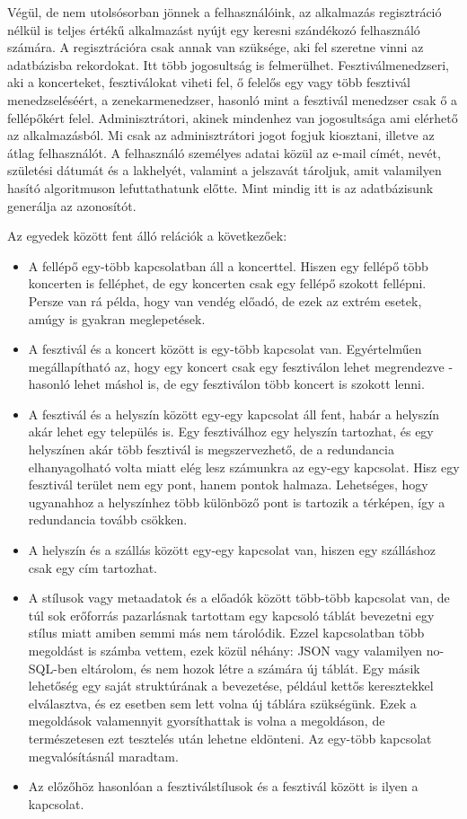 Végül, de nem utolsósorban jönnek a felhasználóink, az alkalmazás regisztráció nélkül is teljes értékű alkalmazást nyújt egy keresni szándékozó felhasználó számára. A regisztrációra csak annak van szüksége, aki fel szeretne vinni az adatbázisba rekordokat. Itt több jogosultság is  felmerülhet. Fesztiválmenedzseri, aki a koncerteket, fesztiválokat viheti fel, ő felelős egy vagy több fesztivál menedzseléséért, a zenekarmenedzser, hasonló mint a fesztivál menedzser csak ő a fellépőkért felel. Adminisztrátori, akinek mindenhez van jogosultsága ami elérhető az alkalmazásból. Mi csak az adminisztrátori jogot fogjuk kiosztani, illetve az átlag felhasználót. A felhasználó személyes adatai közül az e-mail címét, nevét, születési dátumát és a lakhelyét, valamint a jelszavát tároljuk, amit valamilyen hasító algoritmuson lefuttathatunk előtte. Mint mindig itt is az adatbázisunk generálja az azonosítót.

Az egyedek között fent álló relációk a következőek:
\begin{itemize}
\item A fellépő egy-több kapcsolatban áll a koncerttel. Hiszen egy fellépő több koncerten is felléphet, de egy koncerten csak egy fellépő szokott fellépni. Persze van rá példa, hogy van vendég előadó, de ezek az extrém esetek, amúgy is gyakran meglepetések.
\item A fesztivál és a koncert között is egy-több kapcsolat van. Egyértelműen megállapítható az, hogy egy koncert csak egy fesztiválon lehet megrendezve - hasonló lehet máshol is, de egy fesztiválon több koncert is szokott lenni.
\item A fesztivál és a helyszín között egy-egy kapcsolat áll fent, habár a helyszín akár lehet egy település is. Egy fesztiválhoz egy helyszín tartozhat, és egy helyszínen akár több fesztivál is megszervezhető, de a redundancia elhanyagolható volta miatt elég lesz számunkra az egy-egy kapcsolat. Hisz egy fesztivál terület nem egy pont, hanem pontok halmaza. Lehetséges, hogy ugyanahhoz a helyszínhez több különböző pont is tartozik a térképen, így a redundancia tovább csökken.
\item  A helyszín és a szállás között egy-egy kapcsolat van, hiszen egy szálláshoz csak egy cím tartozhat.
\item A stílusok vagy metaadatok és a előadók között több-több kapcsolat van, de túl sok erőforrás pazarlásnak tartottam egy kapcsoló táblát bevezetni egy stílus miatt amiben semmi más nem tárolódik. Ezzel kapcsolatban több megoldást is számba vettem, ezek közül néhány: JSON vagy valamilyen no-SQL-ben eltárolom, és nem hozok létre a számára új táblát. Egy másik lehetőség egy saját struktúrának a bevezetése, például kettős keresztekkel elválasztva, és ez esetben sem lett volna új táblára szükségünk. Ezek a megoldások valamennyit gyorsíthattak is volna a megoldáson, de természetesen ezt tesztelés után lehetne eldönteni. Az egy-több kapcsolat megvalósításnál maradtam.
\item Az előzőhöz hasonlóan a fesztiválstílusok és a fesztivál között is ilyen a kapcsolat.
\end{itemize}

